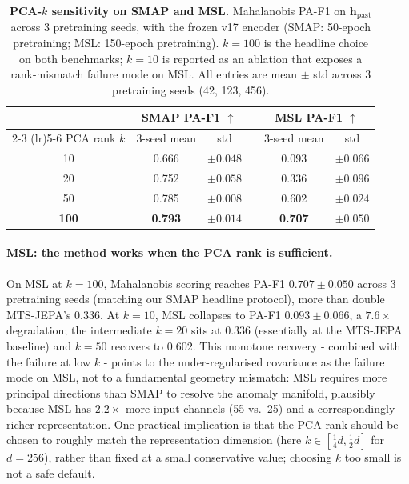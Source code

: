 \documentclass{article}
\newcommand{\h}{\mathbf{h}}
\begin{document}
\begin{table}[h]
\centering
\caption{\textbf{PCA-$k$ sensitivity on SMAP and MSL.} Mahalanobis PA-F1 on $\h_\text{past}$ across 3 pretraining seeds, with the frozen v17 encoder (SMAP: 50-epoch pretraining; MSL: 150-epoch pretraining). $k=100$ is the headline choice on both benchmarks; $k=10$ is reported as an ablation that exposes a rank-mismatch failure mode on MSL. All entries are mean $\pm$ std across 3 pretraining seeds (42, 123, 456).}
\label{tab:pca_sweep}
\small
\begin{tabular}{@{}cccccc@{}}
\toprule
 & \multicolumn{2}{c}{SMAP PA-F1 $\uparrow$} & & \multicolumn{2}{c}{MSL PA-F1 $\uparrow$} \\
\cmidrule(lr){2-3} \cmidrule(lr){5-6}
PCA rank $k$ & 3-seed mean & std & & 3-seed mean & std \\
\midrule
10  & 0.666 & $\pm0.048$ & & 0.093 & $\pm0.066$ \\
20  & 0.752 & $\pm0.058$ & & 0.336 & $\pm0.096$ \\
50  & 0.785 & $\pm0.008$ & & 0.602 & $\pm0.024$ \\
\textbf{100} & \textbf{0.793} & $\mathbf{\pm0.014}$ & & \textbf{0.707} & $\mathbf{\pm0.050}$ \\
\bottomrule
\end{tabular}
\end{table}

\paragraph{MSL: the method works when the PCA rank is sufficient.} On MSL at $k=100$, Mahalanobis scoring reaches PA-F1 $0.707 \pm 0.050$ across 3 pretraining seeds (matching our SMAP headline protocol), more than double MTS-JEPA's $0.336$. At $k=10$, MSL collapses to PA-F1 $0.093 \pm 0.066$, a $7.6\times$ degradation; the intermediate $k=20$ sits at $0.336$ (essentially at the MTS-JEPA baseline) and $k=50$ recovers to $0.602$. This monotone recovery - combined with the failure at low $k$ - points to the under-regularised covariance as the failure mode on MSL, not to a fundamental geometry mismatch: MSL requires more principal directions than SMAP to resolve the anomaly manifold, plausibly because MSL has $2.2\times$ more input channels (55 vs.\ 25) and a correspondingly richer representation. One practical implication is that the PCA rank should be chosen to roughly match the representation dimension (here $k \in [\tfrac{1}{4}d, \tfrac{1}{2}d]$ for $d=256$), rather than fixed at a small conservative value; choosing $k$ too small is not a safe default.
\end{document}
